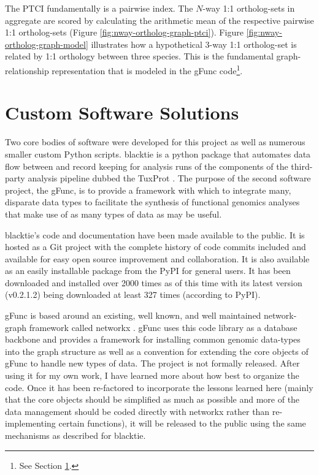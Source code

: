 

The \gls{PTCI} fundamentally is a pairwise index.
The $N$-way 1:1 ortholog-sets in aggregate are scored by calculating the arithmetic mean of the respective pairwise 1:1 ortholog-sets (Figure \ref{fig:nway-ortholog-graph-ptci}).
Figure \ref{fig:nway-ortholog-graph-model} illustrates how a hypothetical 3-way 1:1 ortholog-set is related by 1:1 orthology between three species.
This is the fundamental graph-relationship representation that is modeled in the \gls{gFunc} code\footnote{See Section \ref{sec:custom-software}.}.






\section{Custom Software Solutions}\label{sec:custom-software}

Two core bodies of software were developed for this project as well as numerous smaller custom Python scripts.
\gls{blacktie} is a python package that automates data flow between and record keeping for analysis runs of the components of the third-party analysis pipeline dubbed the \gls{TuxProt} \cite{Trapnell2012}.
The purpose of the second software project, the \gls{gFunc}, is to provide a framework with which to integrate many, disparate data types to facilitate the synthesis of functional genomics analyses that make use of as many types of data as may be useful.

\gls{blacktie}'s code and documentation have been made available to the public.
It is hosted as a \gls{Git} project with the complete history of code commits included and available for easy open source improvement and collaboration.
It is also available as an easily installable package from the \gls{PyPI} for general users.
It has been downloaded and installed over 2000 times as of this time with its latest version (v0.2.1.2) being downloaded at least 327 times (according to \gls{PyPI}).

\gls{gFunc} is based around an existing, well known, and well maintained network-graph framework called networkx \cite{Hagberg2008}.
\gls{gFunc} uses this code library as a database backbone and provides a framework for installing common genomic data-types into the graph structure as well as a convention for extending the core objects of \gls{gFunc} to handle new types of data.
The project is not formally released.
After using it for my own work, I have learned more about how best to organize the code.
Once it has been re-factored to incorporate the lessons learned here (mainly that the core objects should be simplified as much as possible and more of the data management should be coded directly with networkx rather than re-implementing certain functions), it will be released to the public using the same mechanisms as described for \gls{blacktie}.



